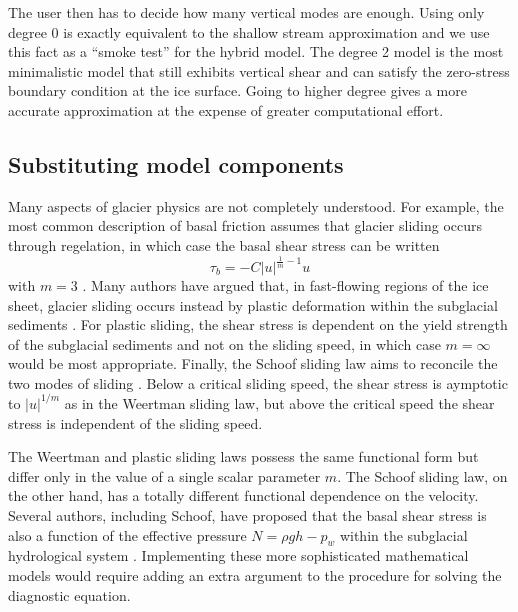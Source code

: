 \documentclass{article}
\theoremstyle{definition}
\theoremstyle{plain}
\begin{document}
The user then has to decide how many vertical modes are enough.
Using only degree 0 is exactly equivalent to the shallow stream approximation and we use this fact as a ``smoke test'' for the hybrid model.
The degree 2 model is the most minimalistic model that still exhibits vertical shear and can satisfy the zero-stress boundary condition at the ice surface.
Going to higher degree gives a more accurate approximation at the expense of greater computational effort.

\subsection{Substituting model components} \label{sec:physics-substitution}

Many aspects of glacier physics are not completely understood.
For example, the most common description of basal friction assumes that glacier sliding occurs through regelation, in which case the basal shear stress can be written
\begin{equation}
    \tau_b = -C|u|^{\frac{1}{m} - 1}u
    \label{eq:weertman-sliding}
\end{equation}
with $m = 3$ \citep{weertman1957sliding}.
Many authors have argued that, in fast-flowing regions of the ice sheet, glacier sliding occurs instead by plastic deformation within the subglacial sediments \citep{tulaczyk2000basal}.
For plastic sliding, the shear stress is dependent on the yield strength of the subglacial sediments and not on the sliding speed, in which case $m = \infty$ would be most appropriate.
Finally, the Schoof sliding law aims to reconcile the two modes of sliding \citep{schoof2005effect}.
Below a critical sliding speed, the shear stress is aymptotic to $|u|^{1/m}$ as in the Weertman sliding law, but above the critical speed the shear stress is independent of the sliding speed.

The Weertman and plastic sliding laws possess the same functional form but differ only in the value of a single scalar parameter $m$.
The Schoof sliding law, on the other hand, has a totally different functional dependence on the velocity.
Several authors, including Schoof, have proposed that the basal shear stress is also a function of the effective pressure $N = \rho gh - p_w$ within the subglacial hydrological system \citep{budd1979empirical, schoof2005effect}.
Implementing these more sophisticated mathematical models would require adding an extra argument to the procedure for solving the diagnostic equation.
\end{document}
